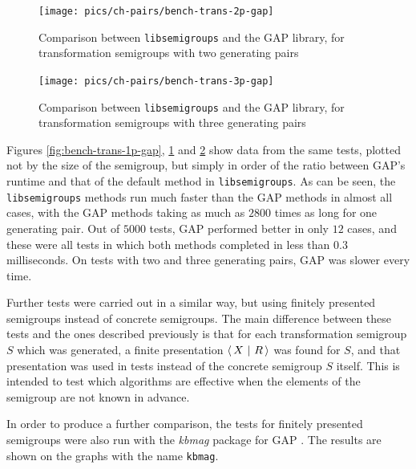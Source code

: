 \begin{figure}[h]
  \centering
  \texttt{[image: pics/ch-pairs/bench-trans-2p-gap]}
  \caption{Comparison between \texttt{libsemigroups} and the GAP library, for
    transformation semigroups with two generating pairs}
  \label{fig:bench-trans-2p-gap}
\end{figure}

\begin{figure}[h]
  \centering
  \texttt{[image: pics/ch-pairs/bench-trans-3p-gap]}
  \caption{Comparison between \texttt{libsemigroups} and the GAP library, for
    transformation semigroups with three generating pairs}
  \label{fig:bench-trans-3p-gap}
\end{figure}

Figures \ref{fig:bench-trans-1p-gap}, \ref{fig:bench-trans-2p-gap} and
\ref{fig:bench-trans-3p-gap} show data from the same tests, plotted not by
the size of the semigroup, but simply in order of the ratio between GAP's
runtime and that of the default method in \texttt{libsemigroups}.  As can be
seen, the \texttt{libsemigroups} methods run much faster than the GAP methods in
almost all cases, with the GAP methods taking as much as $2800$ times as long
for one generating pair.  Out of $5000$ tests, GAP performed better in only $12$
cases, and these were all tests in which both methods completed in less than
$0.3$ milliseconds.  On tests with two and three generating pairs, GAP was
slower every time.

Further tests were carried out in a similar way, but using finitely presented
semigroups instead of concrete semigroups.  The main difference between these
tests and the ones described previously is that for each transformation
semigroup $S$ which was generated, a finite presentation $\left\langle\,X ~\middle|~ R\,\right\rangle$ was found
for $S$, and that presentation was used in tests instead of the concrete
semigroup $S$ itself.  This is intended to test which algorithms are effective
when the elements of the semigroup are not known in advance.

In order to produce a further comparison, the tests for finitely presented
semigroups were also run with the \textit{kbmag} package for GAP \cite{kbmag}.
The results are shown on the graphs with the name \texttt{kbmag}.

